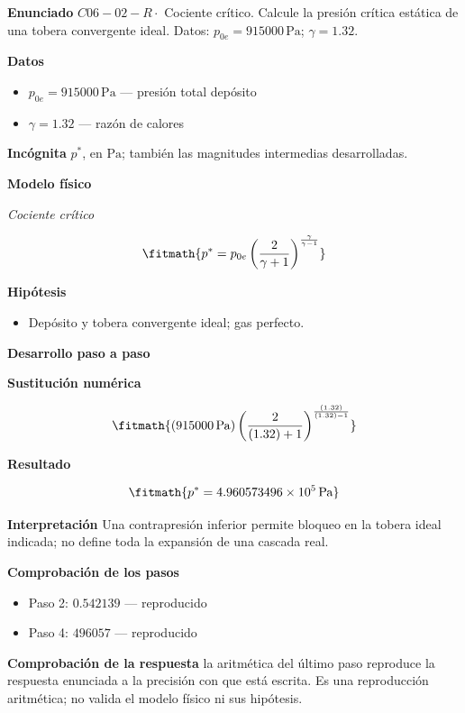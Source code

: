\documentclass[10pt,openany]{book}
\begin{document}
\begin{tcolorbox}[title={Problema resuelto 2}, studiumworked, breakable]

\noindent\textbf{Enunciado}
\(C06-02-R \cdot\) Cociente crítico. Calcule la presión crítica estática de una tobera convergente ideal. Datos: \(p_{0e}=915000\, \mathrm{Pa}\); \(\gamma=1.32\).

\noindent\textbf{Datos}
\begin{itemize}
\item $p_{0e} = 915000\,\mathrm{Pa}$ — presión total depósito
\item $\gamma = 1.32$ — razón de calores
\end{itemize}

\noindent\textbf{Incógnita}
$p^{*}$, en $\mathrm{Pa}$; también las magnitudes intermedias desarrolladas.

\noindent\textbf{Modelo físico}

\noindent\textit{Cociente crítico}

\[
\fitmath{p^{*}=p_{0e} \left(\frac{2}{\gamma + 1}\right)^{\frac{\gamma}{\gamma - 1}}}
\]

\noindent\textbf{Hipótesis}
\begin{itemize}
\item Depósito y tobera convergente ideal; gas perfecto.
\end{itemize}

\noindent\textbf{Desarrollo paso a paso}



\noindent\textbf{Sustitución numérica}

\[
\fitmath{\left(915000\,\mathrm{Pa}\right) \left(\frac{2}{\left(1.32\right) + 1}\right)^{\frac{\left(1.32\right)}{\left(1.32\right) - 1}}}
\]

\noindent\textbf{Resultado}

\[
\fitmath{p^{*}=4.960573496\times10^{5}\,\mathrm{Pa}}
\]

\noindent\textbf{Interpretación}
Una contrapresión inferior permite bloqueo en la tobera ideal indicada; no define toda la expansión de una cascada real.

\noindent\textbf{Comprobación de los pasos}
\begin{itemize}
\item Paso 2: $0.542139$ — reproducido
\item Paso 4: $496057$ — reproducido
\end{itemize}

\noindent\textbf{Comprobación de la respuesta} la aritmética del último paso reproduce la respuesta enunciada a la precisión con que está escrita. Es una reproducción aritmética; no valida el modelo físico ni sus hipótesis.


\end{tcolorbox}
\end{document}

